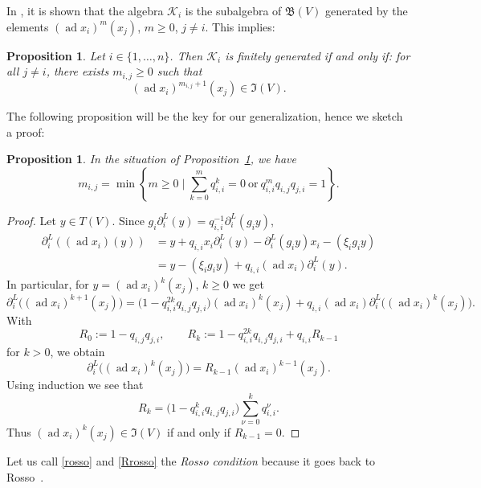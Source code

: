 \documentclass[pdftex]{sigma}
\numberwithin{equation}{section}
\newtheorem{Proposition}[Theorem]{Proposition}
\newcommand{\del }{\partial^L}
\newcommand{\BB }{\mathfrak{B}}
\newcommand{\II }{\mathfrak{I}}
\newcommand{\Kc }{\mathcal{K}}
\DeclareMathOperator{\ad}{ad}
\begin{document}
In \cite[Proposition~1]{p-H-06}, it is shown that the algebra $\Kc_i$ is the subalgebra of $\BB(V)$ generated by the elements $(\ad x_i)^m(x_j)$, $m\ge 0$, $j\ne i$. This implies:

\begin{Proposition}\label{Ki_fg}
Let $i\in\{1,\dots,n\}$. Then $\Kc_i$ is finitely generated if and only if: for all $j\ne i$, there exists $m_{i,j}\ge 0$ such that
\[ (\ad x_i)^{m_{i,j}+1}(x_j) \in \II(V). \]
\end{Proposition}

The following proposition will be the key for our generalization, hence we sketch a proof:

\begin{Proposition}
In the situation of Proposition~{\rm \ref{Ki_fg}}, we have
\begin{equation}\label{rosso}
m_{i,j} = \min \left\{ m\ge 0\mid \sum_{k=0}^m q_{i,i}^k = 0\ \text{or} \ q_{i,i}^{m} q_{i,j}q_{j,i} = 1 \right\}.
\end{equation}
\end{Proposition}
\begin{proof}
Let $y\in T(V)$. Since $g_i \del_i(y) = q_{i,i}^{-1} \del_i(g_i y)$,
\begin{align*}
\del_i((\ad x_i)(y)) &= y+q_{i,i} x_i \del_i(y) - \del_i(g_i y) x_i - (\xi_i g_i y) \\
&= y - (\xi_i g_i y) + q_{i,i} (\ad x_i)\del_i(y).
\end{align*}
In particular, for $y=(\ad x_i)^{k}(x_j)$, $k\ge 0$ we get
\[ \del_i\big((\ad x_i)^{k+1}(x_j)\big) =
\big(1-q_{i,i}^{2k}q_{i,j}q_{j,i}\big) (\ad x_i)^{k}(x_j)
+ q_{i,i} (\ad x_i) \del_i\big((\ad x_i)^{k}(x_j)\big). \]
With
\begin{equation}\label{rosso_rec}
R_0:=1-q_{i,j}q_{j,i}, \qquad
R_k:=
1-q_{i,i}^{2k} q_{i,j}q_{j,i} + q_{i,i} R_{k-1}
\end{equation}
for $k>0$, we obtain
\[ \del_i\big((\ad x_i)^{k}(x_j)\big) = R_{k-1} (\ad x_i)^{k-1}(x_j). \]
Using induction we see that
\begin{equation}\label{Rrosso}
R_k = \big(1-q_{i,i}^{k} q_{i,j}q_{j,i}\big) \sum_{\nu=0}^{k} q_{i,i}^\nu.
\end{equation}
Thus $(\ad x_i)^{k}(x_j)\in\II(V)$ if and only if $R_{k-1}=0$.
\end{proof}

Let us call \eqref{rosso} and \eqref{Rrosso} the {\it Rosso condition} because it goes back to Rosso~\cite{MR1632802}.
\end{document}
